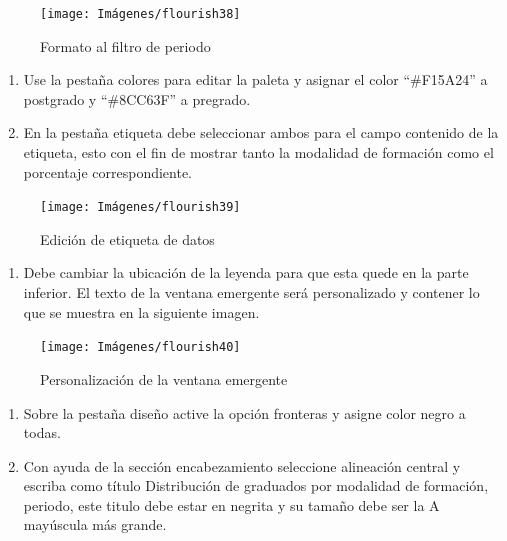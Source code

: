\documentclass[
]{book}
\providecommand{\tightlist}{%
  \setlength{\itemsep}{0pt}\setlength{\parskip}{0pt}}
\begin{document}
\begin{figure}

{\centering \texttt{[image: Imágenes/flourish38]} 

}

\caption{Formato al filtro de periodo}\label{fig:paso2graficocircularflourish-fig}
\end{figure}

\begin{enumerate}
\def\labelenumi{\arabic{enumi}.}
\setcounter{enumi}{2}
\item
  Use la pestaña colores para editar la paleta y asignar el color ``\#F15A24'' a postgrado y ``\#8CC63F'' a pregrado.
\item
  En la pestaña etiqueta debe seleccionar ambos para el campo contenido de la etiqueta, esto con el fin de mostrar tanto la modalidad de formación como el porcentaje correspondiente.
\end{enumerate}

\begin{figure}

{\centering \texttt{[image: Imágenes/flourish39]} 

}

\caption{Edición de etiqueta de datos}\label{fig:paso4graficocircularflourish-fig}
\end{figure}

\begin{enumerate}
\def\labelenumi{\arabic{enumi}.}
\setcounter{enumi}{4}
\tightlist
\item
  Debe cambiar la ubicación de la leyenda para que esta quede en la parte inferior. El texto de la ventana emergente será personalizado y contener lo que se muestra en la siguiente imagen.
\end{enumerate}

\begin{figure}

{\centering \texttt{[image: Imágenes/flourish40]} 

}

\caption{Personalización de la ventana emergente}\label{fig:paso5graficocircularflourish-fig}
\end{figure}

\begin{enumerate}
\def\labelenumi{\arabic{enumi}.}
\setcounter{enumi}{5}
\item
  Sobre la pestaña diseño active la opción fronteras y asigne color negro a todas.
\item
  Con ayuda de la sección encabezamiento seleccione alineación central y escriba como título Distribución de graduados por modalidad de formación, periodo, este titulo debe estar en negrita y su tamaño debe ser la A mayúscula más grande.
\end{enumerate}
\end{document}
